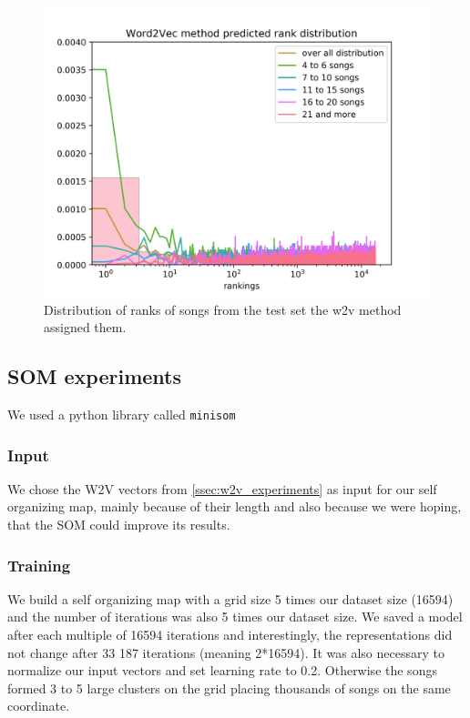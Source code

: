 \begin{figure}[h]
    \centering
	\includegraphics[width=120mm]{./img/w2v_graph.png}
	\caption{Distribution of ranks of songs from the test set the w2v method assigned them.}
	\label{fig:w2v_distribution}
\end{figure}

\subsection{SOM experiments}
We used a python library called \texttt{minisom} \cite{Vettigli2019}
\subsubsection{Input}
We chose the W2V vectors from \ref{ssec:w2v_experiments} as input for our self organizing map, mainly because of their length and also because we were hoping, that the SOM could improve its results.

\subsubsection{Training}
We build a self organizing map with a grid size 5 times our dataset size (16594) and the number of iterations was also 5 times our dataset size. We saved a model after each multiple of 16594 iterations and interestingly, the representations did not change after 33 187 iterations (meaning 2*16594). It was also necessary to normalize our input vectors and set learning rate to 0.2. Otherwise the songs formed 3 to 5 large clusters on the grid placing thousands of songs on the same coordinate. 
